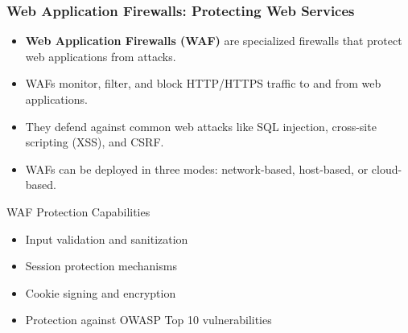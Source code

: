 \documentclass{beamer}
\begin{document}
\begin{frame}
    \frametitle{Web Application Firewalls: Protecting Web Services}
    \begin{itemize}
        \item \textbf{Web Application Firewalls (WAF)} are specialized firewalls that protect web applications from attacks.
        \item WAFs monitor, filter, and block HTTP/HTTPS traffic to and from web applications.
        \item They defend against common web attacks like SQL injection, cross-site scripting (XSS), and CSRF.
        \item WAFs can be deployed in three modes: network-based, host-based, or cloud-based.
    \end{itemize}
    
    \begin{exampleblock}{WAF Protection Capabilities}
        \begin{itemize}
            \item Input validation and sanitization
            \item Session protection mechanisms
            \item Cookie signing and encryption
            \item Protection against OWASP Top 10 vulnerabilities
        \end{itemize}
    \end{exampleblock}
\end{frame}
\end{document}
